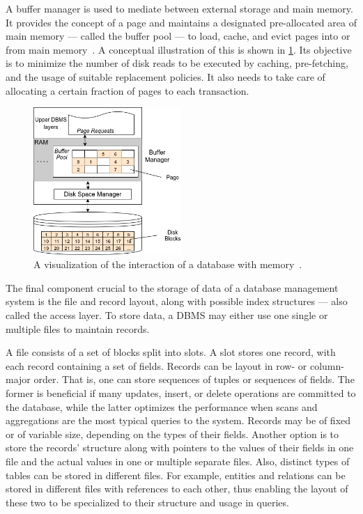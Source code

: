     A buffer manager is used to mediate between external storage and main memory. 
    It provides the concept of a page and maintains a designated pre-allocated area of main memory --- called the buffer pool --- to load, cache, and evict pages into or from main memory~\autocite{ramakrishnan2000database}.
    A conceptual illustration of this is shown in \ref{buf-man}.
    Its objective is to minimize the number of disk reads to be executed by caching, pre-fetching, and the usage of suitable replacement policies. 
    It also needs to take care of allocating a certain fraction of pages to each transaction.

    \begin{figure}[htp]\label{dbms_memory}
        \begin{center}
        \includegraphics[keepaspectratio,height=0.4\textheight,width=0.5\textwidth]{img/04-databases/RDBMS_memory_view.png}
        \end{center}
        \caption{A visualization of the interaction of a database with memory~\autocite{ramakrishnan2000database}.}
        \label{buf-man}
    \end{figure}

    The final component crucial to the storage of data of a database management system is the file and record layout, along with possible index structures --- also called the access layer. 
    To store data, a DBMS may either use one single or multiple files to maintain records. 

    A file consists of a set of blocks split into slots.
    A slot stores one record, with each record containing a set of fields.
    Records can be layout in row- or column-major order.
    That is, one can store sequences of tuples or sequences of fields.
    The former is beneficial if many updates, insert, or delete operations are committed to the database, while the latter optimizes the performance when scans and aggregations are the most typical queries to the system.
    Records may be of fixed or of variable size, depending on the types of their fields. 
    Another option is to store the records' structure along with pointers to the values of their fields in one file and the actual values in one or multiple separate files. 
    Also, distinct types of tables can be stored in different files. 
    For example, entities and relations can be stored in different files with references to each other, thus enabling the layout of these two to be specialized to their structure and usage in queries.

